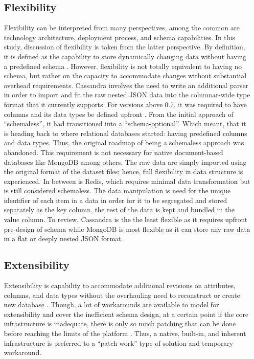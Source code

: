 \documentclass[5p]{elsarticle}
\begin{document}
\subsection{Flexibility}
Flexibility can be interpreted from many perspectives, among the common are technology architecture, deployment process, and schema capabilities. 
In this study, discussion of flexibility is taken from the latter perspective. 
By definition, it is defined as the capability to store dynamically changing data without having a predefined schema \cite{O.Schmitt20121,Z.Goli-Malekabadi201675}. 
However, flexibility is not totally equivalent to having no schema, but rather on the capacity to accommodate changes without substantial overhead requirements. 
Cassandra involves the need to write an additional parser in order to import and fit the raw nested JSON data into the columnar-wide type format that it currently supports.
For versions above 0.7, it was required to have columns and its data types be defined upfront \cite{J.Ellis2018}. From the initial approach of “schemaless”, 
it had transitioned into a “schema-optional”. Which meant, that it is heading back to where relational databases started: having predefined columns and data types. 
Thus, the original roadmap of being a schemaless approach was abandoned. This requirement is not necessary for native document-based databases like MongoDB among others. 
The raw data are simply imported using the original format of the dataset files; hence, full flexibility in data structure is experienced. 
In between is Redis, which requires minimal data transformation but is still considered schemaless. 
The data manipulation is need for the unique identifier of each item in a data in order for it to be segregated and stored separately as the key column,
the rest of the data is kept and bundled in the value column. To review, Cassandra is the the least flexible as it requires upfront pre-design of schema while MongoDB is most 
flexible as it can store any raw data in a flat or deeply nested JSON format.

\subsection{Extensibility}
Extensibility is capability to accommodate additional revisions on attributes, columns, and data types 
without the overhauling need to reconstruct or create new database \cite{S.Wang2013268}. 
Though, a lot of workarounds are available to model for extensibility and cover the inefficient schema design, 
at a certain point if the core infrastructure is inadequate, there is only so much patching that can be done before reaching the limits of the platform \cite{N.Ramachandran2016}.
Thus, a native, built-in, and inherent infrastructure is preferred to a “patch work” type of solution and temporary workaround.\newline
\end{document}
